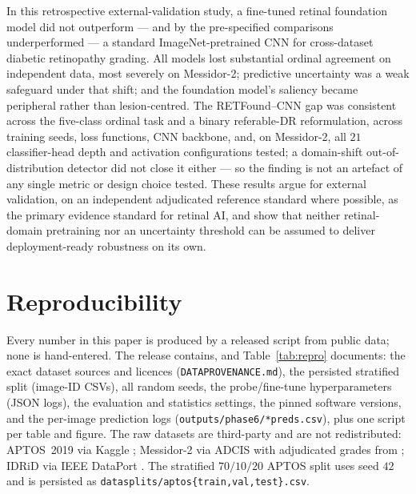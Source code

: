 \documentclass[journal]{IEEEtran}
\renewcommand{\_}{\origunderscore\allowbreak}
\begin{document}
In this retrospective external-validation study, a fine-tuned retinal foundation
model did not outperform --- and by the pre-specified comparisons underperformed
--- a standard ImageNet-pretrained CNN for cross-dataset diabetic retinopathy
grading. All models lost substantial ordinal agreement on independent data, most
severely on Messidor-2; predictive uncertainty was a weak safeguard under that
shift; and the foundation model's saliency became peripheral rather than
lesion-centred. The RETFound--CNN gap was consistent across the five-class
ordinal task and a binary referable-DR reformulation, across training seeds,
loss functions, CNN backbone, and, on Messidor-2, all $21$ classifier-head depth
and activation configurations tested; a domain-shift out-of-distribution
detector did not close it either --- so the finding is not an artefact of any
single metric or design choice tested. These results argue for external
validation, on an independent adjudicated reference standard where possible,
as the primary evidence standard for retinal AI, and show that neither
retinal-domain pretraining nor an uncertainty threshold can be assumed to
deliver deployment-ready robustness on its own.


\section{Reproducibility}
\label{sec:repro}

Every number in this paper is produced by a released script from public data; none
is hand-entered. The release contains, and Table~\ref{tab:repro} documents: the
exact dataset sources and licences (\texttt{DATA\_PROVENANCE.md}), the persisted
stratified split (image-ID CSVs), all random seeds, the probe/fine-tune
hyperparameters (JSON logs), the evaluation and statistics settings, the pinned
software versions, and the per-image prediction logs
(\texttt{outputs/\allowbreak{}phase6/\allowbreak{}*\_preds.csv}), plus one script per table and figure. The
raw datasets are third-party and are not redistributed: APTOS~2019 via Kaggle
\cite{aptos2019}; Messidor-2 via ADCIS \cite{decenciere2014} with adjudicated
grades from \cite{krause2018}; IDRiD via IEEE DataPort \cite{porwal2018}. The
stratified $70/10/20$ APTOS split uses seed $42$ and is persisted as
\texttt{data\_splits/\allowbreak{}aptos\_\{train,val,test\}.csv}.
\end{document}
